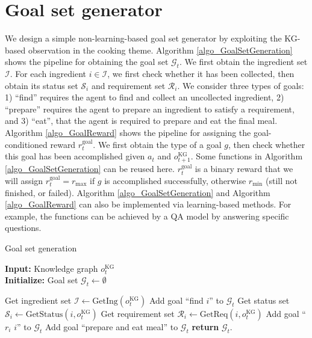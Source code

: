 \documentclass[11pt]{article}
\begin{document}
\section{Goal set generator \label{appendix_goal_set_generator}}
We design a simple non-learning-based goal set generator by exploiting the KG-based observation in the cooking theme.  
Algorithm \ref{algo_GoalSetGeneration} shows the pipeline for obtaining the goal set $\mathcal{G}_t$. We first obtain the ingredient set $\mathcal{I}$. For each ingredient $i \in \mathcal{I}$, we first check whether it has been collected, then obtain its status set $\mathcal{S}_i$ and requirement set $\mathcal{R}_i$. 
We consider three types of goals: 1) ``find'' requires the agent to find and collect an uncollected ingredient, 2) ``prepare'' requires the agent to prepare an ingredient to satisfy a requirement, and 3) ``eat'', that the agent is required to prepare and eat the final meal. 
Algorithm \ref{algo_GoalReward} shows the pipeline for assigning the goal-conditioned reward $r_t^{\text{goal}}$. We first obtain the type of a goal $g$, then check whether this goal has been accomplished given $a_t$ and $o_{t+1}^{\text{KG}}$.  Some functions in Algorithm \ref{algo_GoalSetGeneration} can be reused here.  $r_t^{\text{goal}}$ is a binary reward that we will assign $r_t^{\text{goal}} = r_{\text{max}}$ if $g$ is accomplished successfully, otherwise $r_{\text{min}}$ (still not finished, or failed). Algorithm \ref{algo_GoalSetGeneration} and Algorithm \ref{algo_GoalReward} can also be implemented via learning-based methods. For example, the functions can be achieved by a QA model by answering specific questions. 

\clearpage
\begin{algorithm}[t!]
\small
\caption{Goal set generation}
\label{algo_GoalSetGeneration}
\textbf{Input:} Knowledge graph $o_t^{\text{KG}}$ \\
\textbf{Initialize:} Goal set $\mathcal{G}_t \leftarrow \emptyset$
\begin{algorithmic}[1]
\State Get ingredient set $\mathcal{I} \leftarrow \text{GetIng}(o_t^{\text{KG}})$
\State Add goal ``find $i$'' to $\mathcal{G}_t$
\Else
    \State Get status set $\mathcal{S}_i \leftarrow \text{GetStatus}(i,o_t^{\text{KG}})$
    \State Get requirement set $\mathcal{R}_i \leftarrow \text{GetReq}(i,o_t^{\text{KG}})$
        \State Add goal ``$r_i$ $i$'' to $\mathcal{G}_t$
        \EndIf
    \EndFor
\EndIf
\EndFor
{}
\State Add goal ``prepare and eat meal'' to $\mathcal{G}_t$
\EndIf
\State \textbf{return} $\mathcal{G}_t$.
\end{algorithmic}
\end{algorithm}
\end{document}
